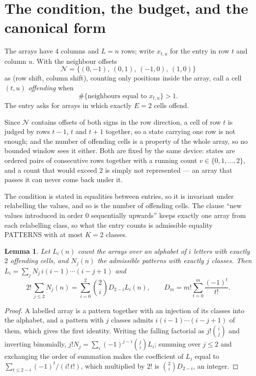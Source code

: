 \documentclass[11pt,a4paper]{article}
\theoremstyle{plain}
\newtheorem{lemma}[theorem]{Lemma}
\theoremstyle{definition}
\begin{document}
\section{The condition, the budget, and the canonical form}

The arrays have $4$ columns and $L=n$ rows; write $x_{t,u}$ for the entry in
row $t$ and column $u$. With the neighbour offsets
\[
\mathcal N=\{(0,-1),\ (0,1),\ (-1,0),\ (1,0)\}
\]
as (row shift, column shift), counting only positions inside the array, call a cell
$(t,u)$ \emph{offending} when
\[
\#\{\text{neighbours equal to }x_{t,u}\}>1 .
\]
The entry asks for arrays in which exactly $E=2$ cells offend.

Since $\mathcal N$ contains offsets of both signs in the row direction, a cell of row
$t$ is judged by rows $t-1$, $t$ and $t+1$ together, so a state carrying one row is not
enough; and the number of offending cells is a property of the whole array, so no bounded
window sees it either. Both are fixed by the same device: states are ordered pairs of
consecutive rows together with a running count $v\in\{0,1,\dots,2\}$, and a count that
would exceed $2$ is simply not represented --- an array that passes it can never come back
under it.

The condition is stated in equalities between entries, so it is invariant under relabelling
the values, and so is the number of offending cells. The clause ``new values introduced in
order $0$ sequentially upwards'' keeps exactly one array from each relabelling class, so what
the entry counts is admissible equality PATTERNS with at most $K=2$ classes.

\begin{lemma}\label{lem:inv}
Let $L_i(n)$ count the arrays over an alphabet of $i$ letters with exactly $2$ offending
cells, and $N_j(n)$ the admissible patterns with exactly $j$ classes. Then
$L_i=\sum_j N_j\,i(i-1)\cdots(i-j+1)$ and
\[
2!\,\sum_{j\le2}N_j(n)=\sum_{i=0}^{2}\binom{2}{i}D_{2-i}L_i(n),
\qquad D_m=m!\sum_{t=0}^{m}\frac{(-1)^t}{t!} .
\]
\end{lemma}

\begin{proof}
A labelled array is a pattern together with an injection of its classes into the alphabet,
and a pattern with $j$ classes admits $i(i-1)\cdots(i-j+1)$ of them, which gives the first
identity. Writing the falling factorial as $j!\binom{i}{j}$ and inverting binomially,
$j!N_j=\sum_i(-1)^{j-i}\binom{j}{i}L_i$; summing over $j\le2$ and exchanging the
order of summation makes the coefficient of $L_i$ equal to
$\sum_{t\le2-i}(-1)^t/(i!\,t!)$, which multiplied by $2!$ is
$\binom{2}{i}D_{2-i}$, an integer.
\end{proof}
\end{document}
